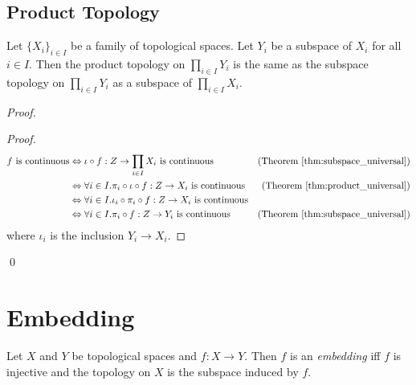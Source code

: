 \subsection{Product Topology}

\begin{prop}
Let $\{X_i\}_{i \in I}$ be a family of topological spaces. Let $Y_i$ be a subspace of $X_i$ for all $i \in I$. Then the product topology on $\prod_{i \in I} Y_i$ is the same as the subspace topology on $\prod_{i \in I} Y_i$ as a subspace of $\prod_{i \in I} X_i$.
\end{prop}

\begin{proof}
\pf
{}
\begin{proof}
	\pf
	\begin{align*}
		f \text{ is continuous}
		& \Leftrightarrow \iota \circ f : Z \rightarrow \prod_{i \in I} X_i \text{ is continuous} & (\text{Theorem \ref{thm:subspace_universal}}) \\
		& \Leftrightarrow \forall i \in I. \pi_i \circ \iota \circ f : Z \rightarrow X_i \text{ is continuous} & (\text{Theorem \ref{thm:product_universal}}) \\
		& \Leftrightarrow \forall i \in I. \iota_i \circ \pi_i \circ f : Z \rightarrow X_i \text{ is continuous} \\
		& \Leftrightarrow \forall i \in I. \pi_i \circ f : Z \rightarrow Y_i \text{ is continuous}
		& (\text{Theorem \ref{thm:subspace_universal}})
	\end{align*}
	where $\iota_i$ is the inclusion $Y_i \rightarrow X_i$.
\end{proof}
\qed
\end{proof}

\section{Embedding}

\begin{df}[Embedding]
Let $X$ and $Y$ be topological spaces and $f : X \rightarrow Y$. Then $f$ is an \emph{embedding} iff $f$ is injective and the topology on $X$ is the subspace induced by $f$.
\end{df}

